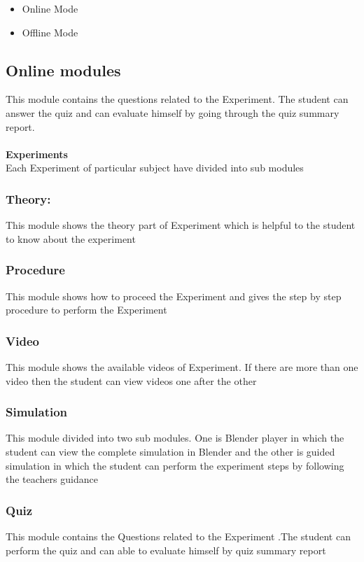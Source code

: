 \documentclass[12pt]{report}
\begin{document}
\begin{itemize}
\item Online Mode
\item Offline Mode
\end{itemize}

\subsection{Online modules}
This module contains the questions related to the Experiment. The student can answer the quiz and can evaluate himself by going through the quiz summary report.\\\\
\textbf{Experiments}\\
Each Experiment of particular subject have divided into sub modules \\
\subsubsection{Theory:}
This module shows the theory part of Experiment which  is helpful to the student to know about the experiment

\subsubsection{Procedure}
This module shows how to proceed the Experiment and gives the step by step procedure to perform the Experiment 

\subsubsection{Video}
This module shows the available videos of Experiment. If there are more than one video then the student can view videos  one after the other

\subsubsection{Simulation}
This module divided into two sub modules. One is Blender player in which the student can view the complete simulation in Blender and the other is guided simulation in which the student can perform the experiment steps by following the teachers guidance

\subsubsection{Quiz}
This module contains the Questions related to the Experiment .The student can perform the quiz and can able to evaluate himself by quiz 	summary report
\end{document}

